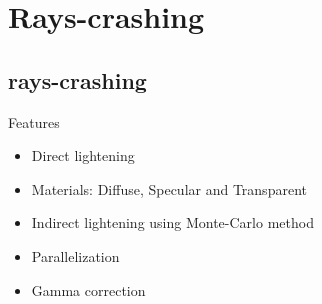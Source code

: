 \documentclass[compress]{beamer}
\begin{document}
\section{Rays-crashing}

\subsection{rays-crashing}
\begin{frame}{Features}
	\begin{itemize}
  \item Direct lightening
  \item Materials: Diffuse, Specular and Transparent
  \item Indirect lightening using Monte-Carlo method
  \item Parallelization
  \item Gamma correction
\end{itemize}
\end{frame}
\end{document}

